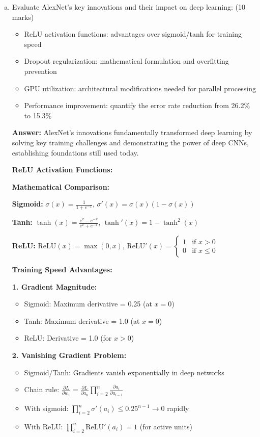 \documentclass[12pt]{article}
\newcommand{\answer}[1]{{\color{answercolor}\textbf{Answer:} #1}}
\newcommand{\explanation}[1]{{\color{explanationcolor}#1}}
\begin{document}
\begin{enumerate}[(a)]
    \item Evaluate AlexNet's key innovations and their impact on deep learning: \hfill (10 marks)
    \begin{itemize}
        \item ReLU activation functions: advantages over sigmoid/tanh for training speed
        \item Dropout regularization: mathematical formulation and overfitting prevention
        \item GPU utilization: architectural modifications needed for parallel processing
        \item Performance improvement: quantify the error rate reduction from 26.2\% to 15.3\%
    \end{itemize}
    
    \answer{AlexNet's innovations fundamentally transformed deep learning by solving key training challenges and demonstrating the power of deep CNNs, establishing foundations still used today.}
    
    \explanation{
    \textbf{ReLU Activation Functions:}
    
    \textbf{Mathematical Comparison:}
    
    \textbf{Sigmoid:} $\sigma(x) = \frac{1}{1 + e^{-x}}$, $\sigma'(x) = \sigma(x)(1-\sigma(x))$
    
    \textbf{Tanh:} $\tanh(x) = \frac{e^x - e^{-x}}{e^x + e^{-x}}$, $\tanh'(x) = 1 - \tanh^2(x)$
    
    \textbf{ReLU:} $\text{ReLU}(x) = \max(0, x)$, $\text{ReLU}'(x) = \begin{cases} 1 & \text{if } x > 0 \\ 0 & \text{if } x \leq 0 \end{cases}$
    
    \textbf{Training Speed Advantages:}
    
    \textbf{1. Gradient Magnitude:}
    \begin{itemize}
        \item Sigmoid: Maximum derivative = 0.25 (at $x = 0$)
        \item Tanh: Maximum derivative = 1.0 (at $x = 0$)  
        \item ReLU: Derivative = 1.0 (for $x > 0$)
    \end{itemize}
    
    \textbf{2. Vanishing Gradient Problem:}
    \begin{itemize}
        \item Sigmoid/Tanh: Gradients vanish exponentially in deep networks
        \item Chain rule: $\frac{\partial L}{\partial w_1} = \frac{\partial L}{\partial a_n} \prod_{i=2}^n \frac{\partial a_i}{\partial a_{i-1}}$
        \item With sigmoid: $\prod_{i=2}^n \sigma'(a_i) \leq 0.25^{n-1} \rightarrow 0$ rapidly
        \item With ReLU: $\prod_{i=2}^n \text{ReLU}'(a_i) = 1$ (for active units)
    \end{itemize}
    
}
\end{enumerate}
\end{document}
